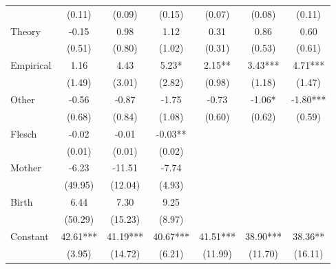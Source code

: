\begin{table}[H]
\begin{threeparttable}
\begin{tabular}{p{3.78cm}S@{}S@{}S@{}S@{}S@{}S@{}}
                                          &      (0.11)   &      (0.09)   &      (0.15)   &      (0.07)   &      (0.08)   &      (0.11)   \\
            Theory                        &       -0.15   &        0.98   &        1.12   &        0.31   &        0.86   &        0.60   \\
                                          &      (0.51)   &      (0.80)   &      (1.02)   &      (0.31)   &      (0.53)   &      (0.61)   \\
            Empirical                     &        1.16   &        4.43   &        5.23*  &        2.15** &        3.43***&        4.71***\\
                                          &      (1.49)   &      (3.01)   &      (2.82)   &      (0.98)   &      (1.18)   &      (1.47)   \\
            Other                         &       -0.56   &       -0.87   &       -1.75   &       -0.73   &       -1.06*  &       -1.80***\\
                                          &      (0.68)   &      (0.84)   &      (1.08)   &      (0.60)   &      (0.62)   &      (0.59)   \\
            Flesch                        &       -0.02   &       -0.01   &       -0.03** &               &               &               \\
                                          &      (0.01)   &      (0.01)   &      (0.02)   &               &               &               \\
            Mother                        &       -6.23   &      -11.51   &       -7.74   &               &               &               \\
                                          &     (49.95)   &     (12.04)   &      (4.93)   &               &               &               \\
            Birth                         &        6.44   &        7.30   &        9.25   &               &               &               \\
                                          &     (50.29)   &     (15.23)   &      (8.97)   &               &               &               \\
            Constant                      &       42.61***&       41.19***&       40.67***&       41.51***&       38.90***&       38.36** \\
                                          &      (3.95)   &     (14.72)   &      (6.21)   &     (11.99)   &     (11.70)   &     (16.11)   \\

\end{tabular}
\end{threeparttable}
\end{table}
